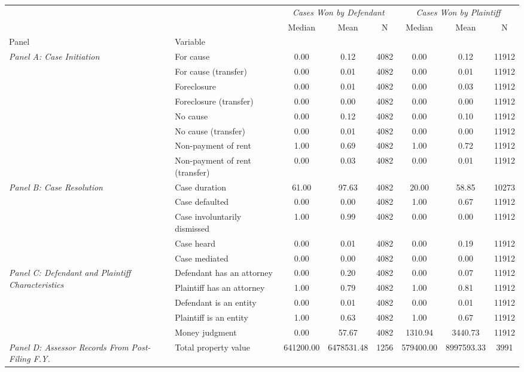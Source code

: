 \begin{tabular}{llcccccc}
\toprule
 &  & \multicolumn{3}{c}{\textit{Cases Won by Defendant}} & \multicolumn{3}{c}{\textit{Cases Won by Plaintiff}} \\
 &  & Median & Mean & N & Median & Mean & N \\
Panel & Variable &  &  &  &  &  &  \\
\midrule
\multirow[c]{8}{4cm}{\textit{Panel A: Case Initiation}} & For cause & 0.00 & 0.12 & 4082 & 0.00 & 0.12 & 11912 \\
 & For cause (transfer) & 0.00 & 0.01 & 4082 & 0.00 & 0.01 & 11912 \\
 & Foreclosure & 0.00 & 0.01 & 4082 & 0.00 & 0.03 & 11912 \\
 & Foreclosure (transfer) & 0.00 & 0.00 & 4082 & 0.00 & 0.00 & 11912 \\
 & No cause & 0.00 & 0.12 & 4082 & 0.00 & 0.10 & 11912 \\
 & No cause (transfer) & 0.00 & 0.01 & 4082 & 0.00 & 0.00 & 11912 \\
 & Non-payment of rent & 1.00 & 0.69 & 4082 & 1.00 & 0.72 & 11912 \\
 & Non-payment of rent (transfer) & 0.00 & 0.03 & 4082 & 0.00 & 0.01 & 11912 \\
\cline{1-8}
\multirow[c]{5}{4cm}{\textit{Panel B: Case Resolution}} & Case duration & 61.00 & 97.63 & 4082 & 20.00 & 58.85 & 10273 \\
 & Case defaulted & 0.00 & 0.00 & 4082 & 1.00 & 0.67 & 11912 \\
 & Case involuntarily dismissed & 1.00 & 0.99 & 4082 & 0.00 & 0.00 & 11912 \\
 & Case heard & 0.00 & 0.01 & 4082 & 0.00 & 0.19 & 11912 \\
 & Case mediated & 0.00 & 0.00 & 4082 & 0.00 & 0.00 & 11912 \\
\cline{1-8}
\multirow[c]{5}{4cm}{\textit{Panel C: Defendant and Plaintiff Characteristics}} & Defendant has an attorney & 0.00 & 0.20 & 4082 & 0.00 & 0.07 & 11912 \\
 & Plaintiff has an attorney & 1.00 & 0.79 & 4082 & 1.00 & 0.81 & 11912 \\
 & Defendant is an entity & 0.00 & 0.01 & 4082 & 0.00 & 0.01 & 11912 \\
 & Plaintiff is an entity & 1.00 & 0.63 & 4082 & 1.00 & 0.67 & 11912 \\
 & Money judgment & 0.00 & 57.67 & 4082 & 1310.94 & 3440.73 & 11912 \\
\cline{1-8}
\multirow[c]{5}{4cm}{\textit{Panel D: Assessor Records From Post-Filing F.Y.}} & Total property value & 641200.00 & 6478531.48 & 1256 & 579400.00 & 8997593.33 & 3991 \\

\end{tabular}
